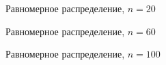 \begin{figure}[H]
		\caption{Равномерное распределение, $n=20$}
		\label{fig:kde_uniform20}
	\end{figure}

\begin{figure}[H]
		\caption{Равномерное распределение, $n=60$}
		\label{fig:kde_uniform60}
	\end{figure}

\begin{figure}[H]
		\caption{Равномерное распределение, $n=100$}
		\label{fig:kde_uniform100}
	\end{figure}
